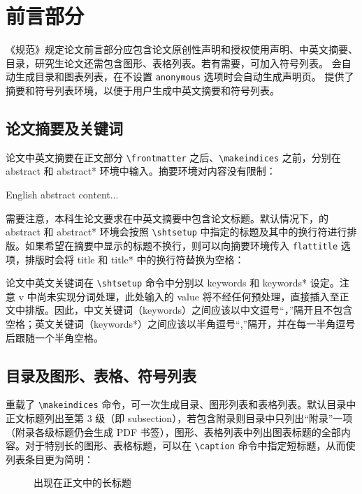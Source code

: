 \documentclass[master]{shtthesis}
\begin{document}
\section{前言部分}
《规范》规定论文前言部分应包含论文原创性声明和授权使用声明、中英文摘要、目录，研究生论文还需包含图形、表格列表。若有需要，可加入符号列表。\shtthesis{} 会自动生成目录和图表列表，在不设置 \verb|anonymous| 选项时会自动生成声明页。\shtthesis{} 提供了摘要和符号列表环境，以便于用户生成中英文摘要和符号列表。

\subsection{论文摘要及关键词}
论文中英文摘要在正文部分 \verb|\frontmatter| 之后、\verb|\makeindices| 之前，分别在 abstract 和 abstract* 环境中输入。摘要环境对内容没有限制：
\begin{latex}
\begin{abstract}
  中文摘要内容...
\end{abstract}

\begin{abstract*}
  English abstract content...
\end{abstract*}
\end{latex}

需要注意，本科生论文要求在中英文摘要中包含论文标题。默认情况下，\shtthesis 的 abstract 和 abstract* 环境会按照 \verb|\shtsetup| 中指定的标题及其中的换行符进行排版。如果希望在摘要中显示的标题不换行，则可以向摘要环境传入 \verb|flattitle| 选项，排版时会将 title 和 title* 中的换行符替换为空格：
\begin{latex}
\begin{abstract}[flattitle]
  中文摘要内容...
\end{abstract}
\end{latex}

论文中英文关键词在 \verb|\shtsetup| 命令中分别以 keywords 和 keywords* 设定。注意 \shtthesis{} v\version{} 中尚未实现分词处理，此处输入的 value 将不经任何预处理，直接插入至正文中排版。因此，中文关键词（keywords）之间应该以中文逗号“，”隔开且不包含空格；英文关键词（keywords*）之间应该以半角逗号“,”隔开，并在每一半角逗号后跟随一个半角空格。
\begin{latex}
\end{latex}

\subsection{目录及图形、表格、符号列表}
\shtthesis{} 重载了 \verb|\makeindices| 命令，可一次生成目录、图形列表和表格列表。默认目录中正文标题列出至第 3 级（即 subsection），若包含附录则目录中只列出“附录”一项（附录各级标题仍会生成 PDF 书签），图形、表格列表中列出图表标题的全部内容。对于特别长的图形、表格标题，可以在 \verb|\caption| 命令中指定短标题，从而使列表条目更为简明：
\begin{latex}
\begin{figure}
  \caption[出现在图形列表内的短标题]{出现在正文中的长标题}
\end{figure}
\end{latex}
\end{document}
